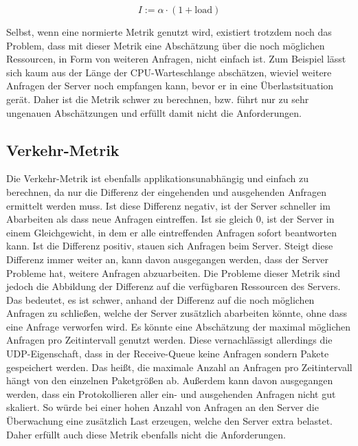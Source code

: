 \documentclass[a4paper, 12pt, BCOR10mm, DIV12, toc=bibliography, toc=listof, german]{scrbook}
\begin{document}
		\begin{equation}
			I := \alpha \cdot (1 + \text{load})
			\label{eq:load}
		\end{equation}

		Selbst, wenn eine normierte Metrik genutzt wird, existiert trotzdem noch das Problem, dass mit
		dieser Metrik eine Abschätzung über die noch möglichen Ressourcen, in Form von weiteren
		Anfragen, nicht einfach ist. Zum Beispiel lässt sich kaum aus der Länge der CPU-Warteschlange
		abschätzen, wieviel weitere Anfragen der Server noch empfangen kann, bevor er in eine
		Überlastsituation gerät. Daher ist die Metrik schwer zu berechnen, bzw. führt nur zu sehr
		ungenauen Abschätzungen und erfüllt damit nicht die Anforderungen.


		\subsection*{Verkehr-Metrik} %

		Die Verkehr-Metrik ist ebenfalls applikationsunabhängig und einfach zu berechnen, da nur die
		Differenz der eingehenden und ausgehenden Anfragen ermittelt werden muss. Ist diese Differenz
		negativ, ist der Server schneller im Abarbeiten als dass neue Anfragen eintreffen. Ist sie gleich
		0, ist der Server in einem Gleichgewicht, in dem er alle eintreffenden Anfragen sofort
		beantworten kann.  Ist die Differenz positiv, stauen sich Anfragen beim Server. Steigt diese
		Differenz immer weiter an, kann davon ausgegangen werden, dass der Server Probleme hat, weitere
		Anfragen abzuarbeiten. Die Probleme dieser Metrik sind jedoch die Abbildung der Differenz auf
		die verfügbaren Ressourcen des Servers. Das bedeutet, es ist schwer, anhand der Differenz auf die
		noch möglichen Anfragen zu schließen, welche der Server zusätzlich abarbeiten könnte, ohne dass
		eine Anfrage verworfen wird. Es könnte eine Abschätzung der maximal möglichen Anfragen pro
		Zeitintervall genutzt werden. Diese vernachlässigt allerdings die UDP-Eigenschaft, dass in der
		Receive-Queue keine Anfragen sondern Pakete gespeichert werden. Das heißt, die maximale
		Anzahl an Anfragen pro Zeitintervall hängt von den einzelnen Paketgrößen ab. Außerdem
		kann davon ausgegangen werden, dass ein Protokollieren aller ein- und ausgehenden Anfragen nicht
		gut skaliert. So würde bei einer hohen Anzahl von Anfragen an den Server die Überwachung
		eine zusätzlich Last erzeugen, welche den Server extra belastet. Daher erfüllt auch diese Metrik
		ebenfalls nicht die Anforderungen.
\end{document}
